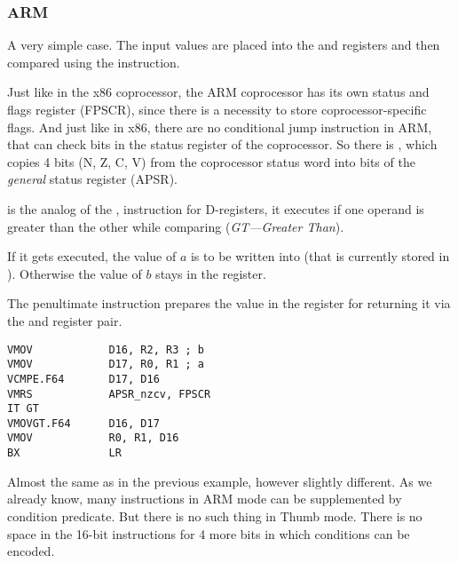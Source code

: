 \subsubsection{ARM}

\myparagraph{\OptimizingXcodeIV (\ARMMode)}



A very simple case.
The input values are placed into the  and  registers and then compared using the  instruction.

Just like in the x86 coprocessor, the ARM coprocessor has its own status and flags register (\ac{FPSCR}),
since there is a necessity to store coprocessor-specific flags.
And just like in x86, there are no conditional jump instruction in ARM, 
that can check bits in the status register of the coprocessor. 
So there is , which copies 4 bits (N, Z, C, V) from the coprocessor status word into bits of the \emph{general} status register (\ac{APSR}).

 is the analog of the , 
instruction for D-registers, it executes if one operand is greater than the other while comparing (\emph{GT---Greater Than}). 

If it gets executed, the value of $a$ is to be written into  (that is currently stored in ).
Otherwise the value of $b$ stays in the  register.


The penultimate instruction  prepares the value in the  register for returning it via the  and 
register pair.

\myparagraph{\OptimizingXcodeIV (\ThumbTwoMode)}

\begin{lstlisting}[caption=\OptimizingXcodeIV (\ThumbTwoMode),style=customasmARM]
VMOV            D16, R2, R3 ; b
VMOV            D17, R0, R1 ; a
VCMPE.F64       D17, D16
VMRS            APSR_nzcv, FPSCR
IT GT 
VMOVGT.F64      D16, D17
VMOV            R0, R1, D16
BX              LR
\end{lstlisting}

Almost the same as in the previous example, however slightly different.
As we already know, many instructions in ARM mode can be supplemented by condition predicate.
But there is no such thing in Thumb mode. 
There is no space in the 16-bit instructions for 4 more bits in which conditions can be encoded.

